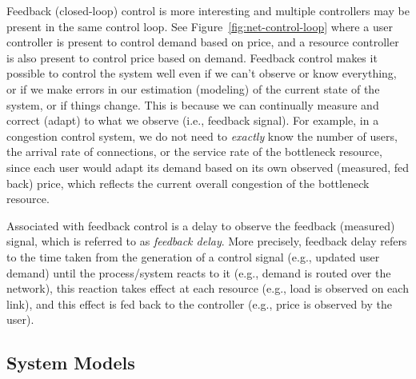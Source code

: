 \documentclass{article}
\begin{document}
Feedback (closed-loop) control is more interesting and multiple controllers may be present in the same control loop. See Figure~\ref{fig:net-control-loop} where a user controller is present to control demand based on price, and a resource controller is also present to control price based on demand. Feedback control makes it possible to control the system well even if we can't observe or know everything, or if we make errors in our estimation (modeling) of the current state of the system, or if things change. This is because we can continually measure and correct (adapt) to what we observe (i.e., feedback signal). For example, in a congestion control system, we do not need to {\em exactly} know the number of users, the arrival rate of connections, or the service rate of the bottleneck resource, since each user would adapt its demand based on its own observed (measured, fed back) price, which reflects the current overall congestion of the bottleneck resource.

Associated with feedback control is a delay to observe the feedback (measured) signal, which is referred to as {\em feedback delay}. More precisely, feedback delay refers to the time taken from the generation of a control signal (e.g., updated user demand) until the process/system reacts to it (e.g., demand is routed over the network), this reaction takes effect at each resource (e.g., load is observed on each link), and this effect is fed back to the controller (e.g., price is observed by the user).

\subsection{System Models}
\end{document}
